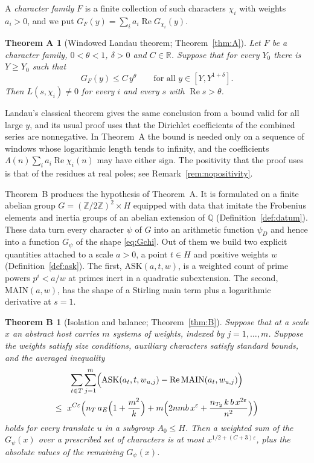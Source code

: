 \documentclass[11pt]{amsart}
\newcommand{\R}{\mathbb{R}}
\newcommand{\Z}{\mathbb{Z}}
\newcommand{\Q}{\mathbb{Q}}
\newcommand{\eps}{\varepsilon}
\newcommand{\re}{\operatorname{Re}}
\newcommand{\ASK}{\mathrm{ASK}}
\newcommand{\MAIN}{\mathrm{MAIN}}
\theoremstyle{plain}
\newtheorem*{theoremA}{Theorem A}
\newtheorem*{theoremB}{Theorem B}
\theoremstyle{definition}
\numberwithin{equation}{section}
\begin{document}
A \emph{character family} $F$ is a finite collection of such characters $\chi_i$ with weights
$a_i>0$, and we put $G_F(y)=\sum_i a_i\re G_{\chi_i}(y)$.

\begin{theoremA}[Windowed Landau theorem; Theorem~\ref{thm:A}]
Let $F$ be a character family, $0<\theta<1$, $\delta>0$ and $C\in\R$. Suppose that for every $Y_0$
there is $Y\ge Y_0$ such that
\[
G_F(y)\le C\,y^{\theta}\qquad\text{for all } y\in[Y,Y^{1+\delta}].
\]
Then $L(s,\chi_i)\neq 0$ for every $i$ and every $s$ with $\re s>\theta$.
\end{theoremA}

Landau's classical theorem gives the same conclusion from a bound valid for all large $y$, and
its usual proof uses that the Dirichlet coefficients of the combined series are nonnegative. In
Theorem~A the bound is needed only on a sequence of windows whose logarithmic length tends to
infinity, and the coefficients $\Lambda(n)\sum_ia_i\re\chi_i(n)$ may have either sign. The
positivity that the proof uses is that of the residues at real poles; see
Remark~\ref{rem:nopositivity}.

Theorem~B produces the hypothesis of Theorem~A. It is formulated on a finite abelian group
$G=(\Z/2\Z)^2\times H$ equipped with data that imitate the Frobenius elements and inertia groups of
an abelian extension of $\Q$ (Definition~\ref{def:datum}). These data turn every character $\psi$
of $G$ into an arithmetic function $\psi_D$ and hence into a function $G_\psi$ of the shape
\eqref{eq:Gchi}. Out of them we build two explicit quantities attached to a scale $a>0$, a point
$t\in H$ and positive weights $w$ (Definition~\ref{def:ask}). The first, $\ASK(a,t,w)$, is a
weighted count of prime powers $p^i<a/w$ at primes inert in a quadratic subextension. The
second, $\MAIN(a,w)$, has the shape of a Stirling main term plus a logarithmic derivative at $s=1$.

\begin{theoremB}[Isolation and balance; Theorem~\ref{thm:B}]
Suppose that at a scale $x$ an abstract host carries $m$ systems of weights, indexed by
$j=1,\dots,m$. Suppose the weights satisfy size conditions, auxiliary characters satisfy
standard bounds, and the averaged inequality
\begin{multline*}
\sum_{t\in T}\sum_{j=1}^{m}\Bigl(\ASK(a_t,t,w_{u,j})-\re\MAIN(a_t,w_{u,j})\Bigr)\\
\le\ x^{C\eps}\Bigl(n_T\,a_E\Bigl(1+\frac{m^2}{k}\Bigr)+m\Bigl(2nmb\,x^{\eps}+\frac{n_{T_2}\,k\,b\,x^{2\eps}}{n^{2}}\Bigr)\Bigr)
\end{multline*}
holds for every translate $u$ in a subgroup $A_0\le H$. Then a weighted sum of the $G_\psi(x)$ over a
prescribed set of characters is at most $x^{1/2+(C+3)\eps}$, plus the absolute values of the
remaining $G_\psi(x)$.
\end{theoremB}
\end{document}
